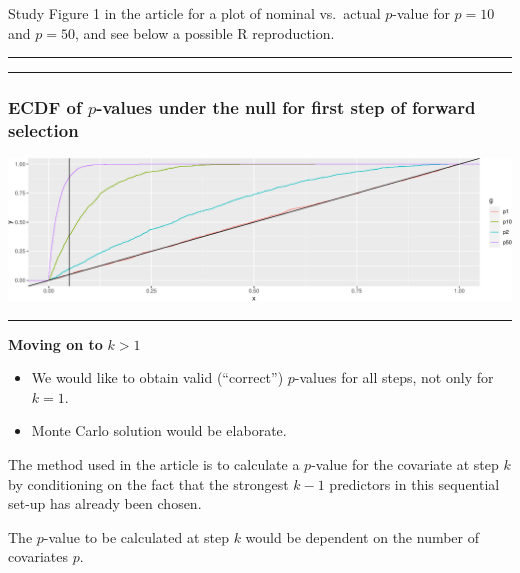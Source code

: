 \documentclass[
  letterpaper,
  DIV=11,
  numbers=noendperiod]{scrartcl}
\providecommand{\tightlist}{%
  \setlength{\itemsep}{0pt}\setlength{\parskip}{0pt}}\usepackage{longtable,booktabs,array}
\begin{document}
Study Figure 1 in the article for a plot of nominal vs.~actual
\(p\)-value for \(p=10\) and \(p=50\), and see below a possible R
reproduction.

\begin{center}\rule{0.5\linewidth}{0.5pt}\end{center}

\begin{center}\rule{0.5\linewidth}{0.5pt}\end{center}

\hypertarget{ecdf-of-p-values-under-the-null-for-first-step-of-forward-selection}{%
\subsubsection{\texorpdfstring{ECDF of \(p\)-values under the null for
first step of forward
selection}{ECDF of p-values under the null for first step of forward selection}}\label{ecdf-of-p-values-under-the-null-for-first-step-of-forward-selection}}

\includegraphics{W6_files/figure-pdf/unnamed-chunk-39-1.pdf}

\begin{center}\rule{0.5\linewidth}{0.5pt}\end{center}

\textbf{Moving on to} \(k>1\)

\begin{itemize}
\tightlist
\item
  We would like to obtain valid (``correct'') \(p\)-values for all
  steps, not only for \(k=1\).
\item
  Monte Carlo solution would be elaborate.
\end{itemize}

The method used in the article is to calculate a \(p\)-value for the
covariate at step \(k\) by conditioning on the fact that the strongest
\(k-1\) predictors in this sequential set-up has already been chosen.

The \(p\)-value to be calculated at step \(k\) would be dependent on the
number of covariates \(p\).
\end{document}
